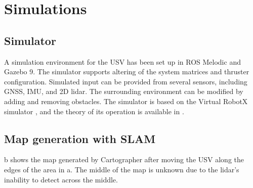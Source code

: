 \chapter{Simulations}

\section{Simulator}

A simulation environment for the USV has been set up in ROS Melodic and Gazebo 9. The simulator supports altering of the system matrices and thruster configuration. Simulated input can be provided from several sensors, including GNSS, IMU, and 2D lidar. The surrounding environment can be modified by adding and removing obstacles. The simulator is based on the Virtual RobotX simulator \citep{website:vrx}, and the theory of its operation is available in \citet{website:vrx_to}.

\section{Map generation with SLAM}

b shows the map generated by Cartographer after moving the USV along the edges of the area in a. The middle of the map is unknown due to the lidar's inability to detect across the middle.

